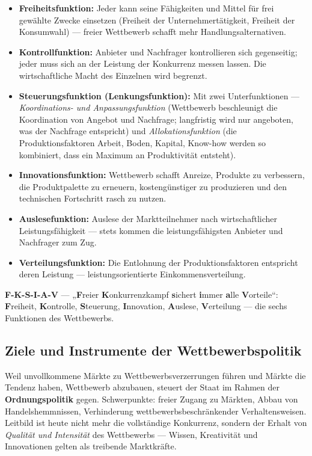 \documentclass[11pt, a4paper]{article}
\begin{document}
\begin{itemize}
  \item \textbf{Freiheitsfunktion:} Jeder kann seine Fähigkeiten und Mittel für frei
    gewählte Zwecke einsetzen (Freiheit der Unternehmertätigkeit, Freiheit der
    Konsumwahl) --- freier Wettbewerb schafft mehr Handlungsalternativen.
  \item \textbf{Kontrollfunktion:} Anbieter und Nachfrager kontrollieren sich gegenseitig;
    jeder muss sich an der Leistung der Konkurrenz messen lassen. Die wirtschaftliche
    Macht des Einzelnen wird begrenzt.
  \item \textbf{Steuerungsfunktion (Lenkungsfunktion):} Mit zwei Unterfunktionen ---
    \emph{Koordinations- und Anpassungsfunktion} (Wettbewerb beschleunigt die Koordination
    von Angebot und Nachfrage; langfristig wird nur angeboten, was der Nachfrage
    entspricht) und \emph{Allokationsfunktion} (die Produktionsfaktoren Arbeit, Boden,
    Kapital, Know-how werden so kombiniert, dass ein Maximum an Produktivität entsteht).
  \item \textbf{Innovationsfunktion:} Wettbewerb schafft Anreize, Produkte zu verbessern,
    die Produktpalette zu erneuern, kostengünstiger zu produzieren und den technischen
    Fortschritt rasch zu nutzen.
  \item \textbf{Auslesefunktion:} Auslese der Marktteilnehmer nach wirtschaftlicher
    Leistungsfähigkeit --- stets kommen die leistungsfähigsten Anbieter und Nachfrager
    zum Zug.
  \item \textbf{Verteilungsfunktion:} Die Entlohnung der Produktionsfaktoren entspricht
    deren Leistung --- leistungsorientierte Einkommensverteilung.
\end{itemize}

\begin{eselsbruecke}
\textbf{F-K-S-I-A-V} --- „\textbf{F}reier \textbf{K}onkurrenzkampf \textbf{s}ichert
\textbf{i}mmer \textbf{a}lle \textbf{V}orteile``: \textbf{F}reiheit, \textbf{K}ontrolle,
\textbf{S}teuerung, \textbf{I}nnovation, \textbf{A}uslese, \textbf{V}erteilung ---
die sechs Funktionen des Wettbewerbs.
\end{eselsbruecke}

\subsection{Ziele und Instrumente der Wettbewerbspolitik}

Weil unvollkommene Märkte zu Wettbewerbsverzerrungen führen und Märkte die Tendenz haben,
Wettbewerb abzubauen, steuert der Staat im Rahmen der \textbf{Ordnungspolitik} gegen.
Schwerpunkte: freier Zugang zu Märkten, Abbau von Handelshemmnissen, Verhinderung
wettbewerbsbeschränkender Verhaltensweisen. Leitbild ist heute nicht mehr die
vollständige Konkurrenz, sondern der Erhalt von \emph{Qualität und Intensität} des
Wettbewerbs --- Wissen, Kreativität und Innovationen gelten als treibende Marktkräfte.
\end{document}
